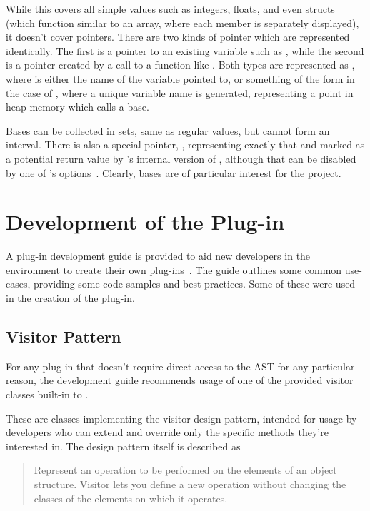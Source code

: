 While this covers all simple values such as integers, floats, and even structs (which function similar to an array, where each member is separately displayed), it doesn't cover pointers. There are two kinds of pointer which are represented identically. The first is a pointer to an existing variable such as , while the second is a pointer created by a call to a function like \malloc{}. Both types are represented as , where  is either the name of the variable pointed to, or something of the form  in the case of \malloc{}, where a unique variable name is generated, representing a point in heap memory which  calls a base.

Bases can be collected in sets, same as regular values, but cannot form an interval. There is also a special pointer, , representing exactly that and marked as a potential return value by 's internal version of \malloc{}, although that can be disabled by one of 's options~\cite{framamalloc}. Clearly, bases are of particular interest for the project.

\section{Development of the  Plug-in}

A plug-in development guide is provided to aid new developers in the  environment to create their own plug-ins~\cite{framaplug}. The guide outlines some common use-cases, providing some code samples and best practices. Some of these were used in the creation of the  plug-in.

\subsection{Visitor Pattern}

For any plug-in that doesn't require direct access to the AST for any particular reason, the development guide recommends usage of one of the provided visitor classes built-in to .

These are classes implementing the visitor design pattern, intended for usage by developers who can extend and override only the specific methods they're interested in. The design pattern itself is described as

\begin{quote}
	Represent an operation to be performed on the elements of an object structure. Visitor lets you define a new operation without changing the classes of the elements on which it operates.~\cite{gof}
\end{quote}

